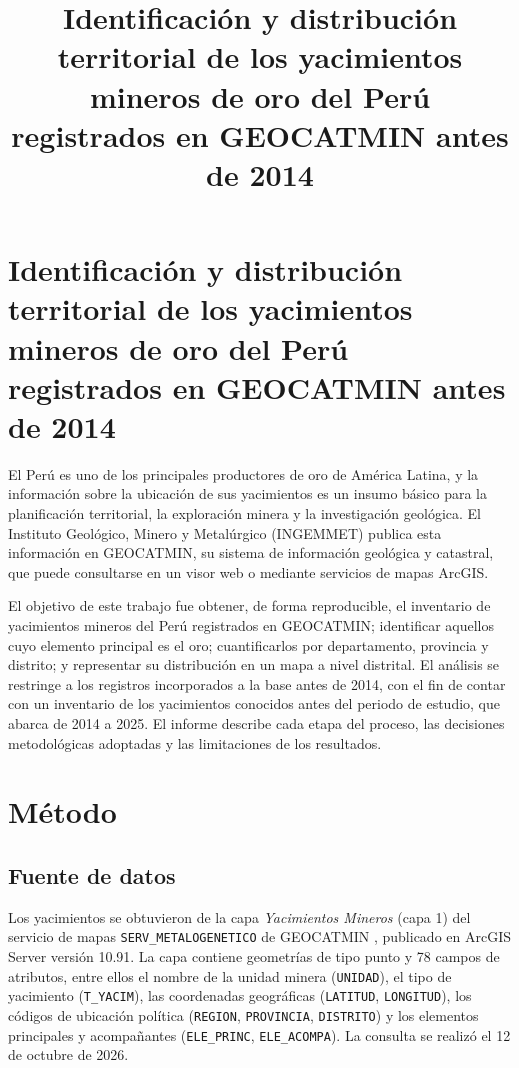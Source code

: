 \documentclass[man,12pt,a4paper,floatsintext,donotrepeattitle]{apa7}
\title{Identificación y distribución territorial de los yacimientos mineros de oro del Perú registrados en GEOCATMIN antes de 2014}
\begin{document}
\renewcommand{\keywordname}{Palabras clave}
\renewcommand{\acksname}{Nota del autor}
\hypersetup{hidelinks}
\maketitle

\section*{Identificación y distribución territorial de los yacimientos mineros de oro del Perú registrados en GEOCATMIN antes de 2014}

El Perú es uno de los principales productores de oro de América Latina, y la
información sobre la ubicación de sus yacimientos es un insumo básico para la
planificación territorial, la exploración minera y la investigación geológica.
El Instituto Geológico, Minero y Metalúrgico (INGEMMET) publica esta información
en GEOCATMIN, su sistema de información geológica y catastral, que puede
consultarse en un visor web o mediante servicios de mapas ArcGIS.

El objetivo de este trabajo fue obtener, de forma reproducible, el inventario de
yacimientos mineros del Perú registrados en GEOCATMIN; identificar aquellos cuyo
elemento principal es el oro; cuantificarlos por departamento, provincia y
distrito; y representar su distribución en un mapa a nivel distrital. El
análisis se restringe a los registros incorporados a la base antes de 2014, con
el fin de contar con un inventario de los yacimientos conocidos antes del periodo
de estudio, que abarca de 2014 a 2025. El informe describe cada etapa del
proceso, las decisiones metodológicas adoptadas y las limitaciones de los
resultados.

\section{Método}

\subsection{Fuente de datos}

Los yacimientos se obtuvieron de la capa \textit{Yacimientos Mineros} (capa 1)
del servicio de mapas \texttt{SERV\_METALOGENETICO} de GEOCATMIN
\parencite{ingemmet2026}, publicado en ArcGIS Server versión 10.91. La capa
contiene geometrías de tipo punto y 78 campos de atributos, entre ellos el
nombre de la unidad minera (\texttt{UNIDAD}), el tipo de yacimiento
(\texttt{T\_YACIM}), las coordenadas geográficas (\texttt{LATITUD},
\texttt{LONGITUD}), los códigos de ubicación política (\texttt{REGION},
\texttt{PROVINCIA}, \texttt{DISTRITO}) y los elementos principales y
acompañantes (\texttt{ELE\_PRINC}, \texttt{ELE\_ACOMPA}). La consulta se realizó
el 12 de octubre de 2026.
\end{document}
